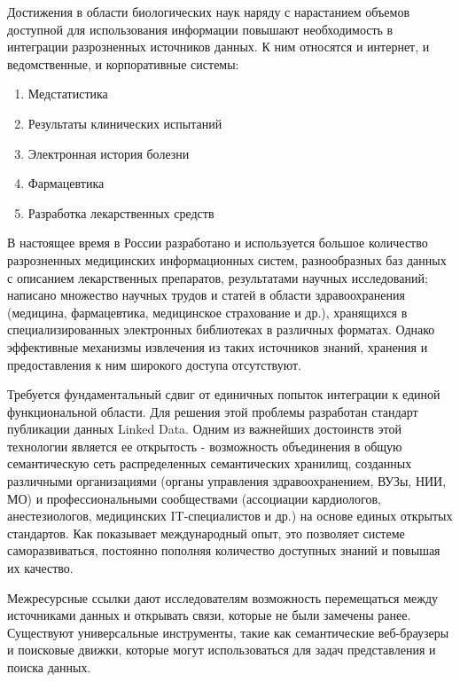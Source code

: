 \documentclass[specialist,subf,href,colorlinks=true
]{disser}
\begin{document}
\tableofcontents %

\intro

Достижения в области биологических наук наряду с нарастанием объемов доступной для использования информации повышают необходимость в интеграции разрозненных источников данных. К ним относятся и интернет, и ведомственные, и корпоративные системы:
\begin{enumerate}
\item Медстатистика
\item Результаты клинических испытаний
\item Электронная история болезни
\item Фармацевтика
\item Разработка лекарственных средств
\end{enumerate}

В настоящее время в России разработано и используется большое количество разрозненных медицинских информационных систем, разнообразных баз данных с описанием лекарственных препаратов, результатами научных исследований; написано множество научных трудов и статей в области здравоохранения (медицина, фармацевтика, медицинское страхование и др.), хранящихся в специализированных электронных библиотеках в различных форматах. Однако эффективные механизмы извлечения из таких источников знаний, хранения и предоставления к ним широкого доступа отсутствуют.

Требуется фундаментальный сдвиг от единичных попыток интеграции к единой функциональной области. Для решения этой проблемы разработан стандарт публикации данных Linked Data. Одним из важнейших достоинств этой технологии является ее открытость - возможность объединения в общую семантическую сеть распределенных семантических хранилищ, созданных различными организациями (органы управления здравоохранением, ВУЗы, НИИ, МО) и профессиональными сообществами (ассоциации кардиологов, анестезиологов, медицинских IT-специалистов и др.) на основе единых открытых стандартов. Как показывает международный опыт, это позволяет системе саморазвиваться, постоянно пополняя количество доступных знаний и повышая их качество.

Межресурсные ссылки дают исследователям возможность перемещаться между источниками данных и открывать связи, которые не были замечены ранее. Существуют универсальные инструменты, такие как семантические веб-браузеры и поисковые движки, которые могут использоваться для задач представления и поиска данных.
\end{document}
